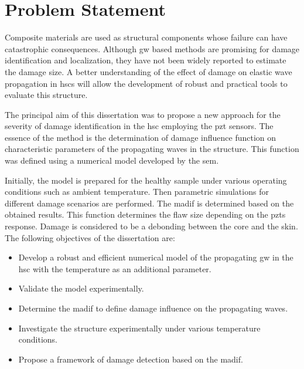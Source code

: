 

\chapter[Problem Statement]{Problem Statement}
\label{ch:problem}



Composite materials are used as structural components whose failure can have catastrophic consequences.
Although \ac{gw} based methods are promising for damage identification and localization, they have not been widely reported to estimate the damage size.
A better understanding of the effect of damage on elastic wave propagation in \acp{hsc} will allow the development of robust and practical tools to evaluate this structure.

The principal aim of this dissertation was to propose a new approach for the severity of damage identification in the \ac{hsc} employing the \ac{pzt} sensors.
The essence of the method is the determination of damage influence function on characteristic parameters of the propagating waves in the structure.
This function was defined using a numerical model developed by the \ac{sem}.

Initially, the model is prepared for the healthy sample under various operating conditions such as ambient temperature.
Then parametric simulations for different damage scenarios are performed.
The \ac{madif} is determined based on the obtained results. 
This function determines the flaw size depending on the \acp{pzt} response.
Damage is considered to be a debonding between the core and the skin. 
The following objectives of the dissertation are:
\begin{itemize}
	\item Develop a robust and efficient numerical model of the propagating \ac{gw} in the \ac{hsc} with the temperature as an additional parameter.
	\item Validate the model experimentally.
	\item Determine the \ac{madif} to define damage influence on the propagating waves.
	\item Investigate the structure experimentally under various temperature conditions.
	\item Propose a framework of damage detection based on the \ac{madif}.
\end{itemize}

